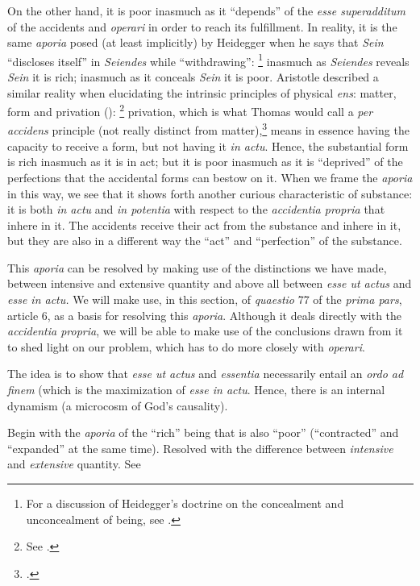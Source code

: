 %
On the other hand, it is poor inasmuch as it ``depends'' of the \emph{esse superadditum} of the accidents and \emph{operari} in order to reach its fulfillment. In reality, it is the same \emph{aporia} posed (at least implicitly) by Heidegger when he says that \emph{Sein} “discloses itself” in \emph{Seiendes} while ``withdrawing'':%
%
\footnote{For a discussion of Heidegger's doctrine on the concealment and unconcealment of being, see \cite[200--203]{contat:confronto}.}
%
inasmuch as \emph{Seiendes} reveals \emph{Sein} it is rich; inasmuch as it conceals \emph{Sein} it is poor.
Aristotle described a similar reality when elucidating the intrinsic principles of physical \emph{ens}: matter, form and privation ():%
%
\footnote{See \cite[160--163]{definance:etre-et-agir}.}
%
privation, which is what Thomas would call a \emph{per accidens} principle (not really distinct from matter),\footcite[9]{st:deprincipiis} means in essence having the capacity to receive a form, but not having it \emph{in actu}. Hence, the substantial form is rich inasmuch as it is in act; but it is poor inasmuch as it is ``deprived'' of the perfections that the accidental forms can bestow on it.
%
When we frame the \emph{aporia} in this way, we see that it shows forth another curious characteristic of substance: it is both \emph{in actu} and \emph{in potentia} with respect to the \emph{accidentia propria} that inhere in it. The accidents receive their act from the substance and inhere in it, but they are also in a different way the ``act'' and ``perfection'' of the substance.

This \emph{aporia} can be resolved by making use of the distinctions we have made, between intensive and extensive quantity and above all between \emph{esse ut actus} and \emph{esse in actu.} We will make use, in this section, of \emph{quaestio} 77 of the \emph{prima pars}, article 6, as a basis for resolving this \emph{aporia}. Although it deals directly with the \emph{accidentia propria}, we will be able to make use of the conclusions drawn from it to shed light on our problem, which has to do more closely with \emph{operari}.

\begin{DONE}

The idea is to show that \emph{esse ut actus} and \emph{essentia} necessarily entail an \emph{ordo ad finem} (which is the maximization of \emph{esse in actu}. Hence, there is an internal dynamism (a microcosm of God's causality).

  \item Begin with the \emph{aporia} of the ``rich'' being that is also ``poor'' (``contracted'' and ``expanded'' at the same time). Resolved with the difference between \emph{intensive} and \emph{extensive} quantity. See 

\end{DONE}

